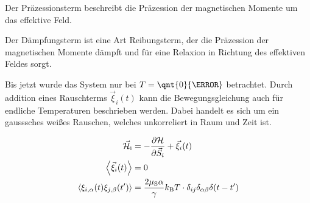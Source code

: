 \documentclass[main.tex]{subfiles}
\begin{document}
Der Präzessionsterm beschreibt die Präzession der magnetischen Momente um das effektive Feld.

Der Dämpfungsterm ist eine Art Reibungsterm, der die Präzession der magnetischen Momente dämpft und für eine Relaxion in Richtung des effektiven Feldes sorgt.

Bis jetzt wurde das System nur bei \(T = \qnt{0}{\kelvin}\) betrachtet.
Durch addition eines Rauschterms \(\vec{\xi}_i(t)\) kann die Bewegungsgleichung auch für endliche Temperaturen beschrieben werden.
Dabei handelt es sich um ein gausssches weißes Rauschen, welches unkorreliert in Raum und Zeit ist.

\begin{align}
	\vec{\mathcal{H}}_{\text{i}} 
	& = -\pdv{\mathcal{H}}{\vec{S}_i} + \vec{\xi}_i(t) \\
	\expval{\vec{\xi}_i(t)} & = 0 \\
	\expval{\xi_{i,\alpha}(t) \xi_{j,\beta}(t')} 
	& = \frac{2\mu_\text{S} \alpha}{\gamma}k_\text{B} T \cdot \delta_{ij} \delta_{\alpha \beta}	\delta(t-t')
\end{align}
\end{document}
